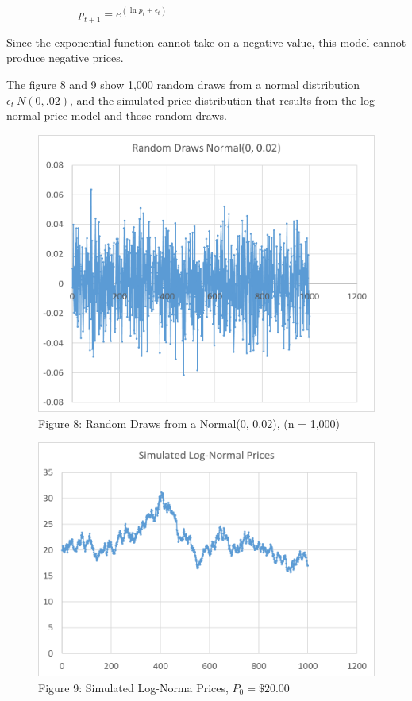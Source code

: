 \documentclass[]{book}
\theoremstyle{definition}
\theoremstyle{definition}
\theoremstyle{remark}
\begin{document}
~~~~~~~~~~~~~\(p_{t+1} = e^{(\ln{p_{t}} + \epsilon_t)}\)

Since the exponential function cannot take on a negative value, this
model cannot produce negative prices.

The figure 8 and 9 show 1,000 random draws from a normal distribution
\(\epsilon_t ~ N(0, .02)\), and the simulated price distribution that
results from the log-normal price model and those random draws.

\begin{figure}[htbp]
\centering
\includegraphics{Excel-files/IntroductiontoCommodityTS-random_walk_files/image007.png}
\caption{Figure 8: Random Draws from a Normal(0, 0.02), (n = 1,000)}
\end{figure}

\begin{figure}[htbp]
\centering
\includegraphics{Excel-files/IntroductiontoCommodityTS-random_walk_files/image005.png}
\caption{Figure 9: Simulated Log-Norma Prices, \(P_0 = \$20.00\)}
\end{figure}
\end{document}
